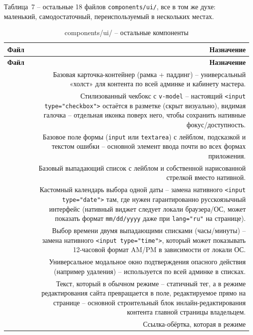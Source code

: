 Таблица~7 -- остальные 18 файлов \texttt{components/ui/}, все в том же
духе: маленький, самодостаточный, переиспользуемый в нескольких местах.

\begin{xltabular}{\textwidth}{M D}
\caption{components/ui/ -- остальные компоненты} \\
\hline
\textbf{Файл} & \textbf{Назначение} \\
\hline
\endfirsthead
\hline
\textbf{Файл} & \textbf{Назначение} \\
\hline
\endhead
\hline
\endfoot
{} & Базовая карточка-контейнер (рамка + паддинг) --
  универсальный «холст» для контента по всей админке и кабинету мастера. \\
 & Стилизованный чекбокс с \texttt{v-model} --
  настоящий \texttt{<input type="checkbox">} остаётся в разметке (скрыт
  визуально), видимая галочка -- отдельная иконка поверх него, чтобы
  сохранить нативные фокус/доступность. \\
 & Базовое поле формы (\texttt{input} или
  \texttt{textarea}) с лейблом, подсказкой и текстом ошибки -- основной
  элемент ввода почти во всех формах приложения. \\
 & Базовый выпадающий список с лейблом и
  собственной нарисованной стрелкой вместо нативной. \\
 & Кастомный календарь выбора одной даты --
  замена нативного \texttt{<input type="date">} там, где нужен
  гарантированно русскоязычный интерфейс (нативный виджет следует локали
  браузера/ОС, может показать формат \texttt{mm/dd/yyyy} даже при
  \texttt{lang="ru"} на странице). \\
 & Выбор времени двумя выпадающими списками
  (часы/минуты) -- замена нативного \texttt{<input type="time">}, который
  может показывать 12-часовой формат AM/PM в зависимости от локали ОС. \\
 & Универсальное модальное окно подтверждения
  опасного действия (например удаления) -- используется по всей админке
  в списках. \\
 & Текст, который в обычном режиме -- статичный
  тег, а в режиме редактирования сайта превращается в поле,
  редактируемое прямо на странице -- основной строительный блок
  инлайн-редактирования контента главной страницы владельцем. \\
 & Ссылка-обёртка, которая в режиме

\end{xltabular}
